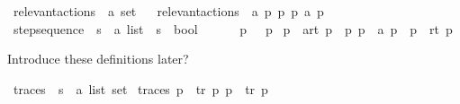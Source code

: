 \begin{isabellebody}
\isamarkupfalse%
\ relevant{\isacharunderscore}{\kern0pt}actions\ {\isacharcolon}{\kern0pt}{\isacharcolon}{\kern0pt}\ {\isacartoucheopen}{\isacharprime}{\kern0pt}a\ set{\isacartoucheclose}\isanewline
\ \ \isanewline
{\isacartoucheopen}relevant{\isacharunderscore}{\kern0pt}actions\ {\isasymequiv}\ {\isacharbraceleft}{\kern0pt}a{\isachardot}{\kern0pt}\ {\isasymexists}p\ p{\isacharprime}{\kern0pt}{\isachardot}{\kern0pt}\ p\ {\isasymmapsto}a\ p{\isacharprime}{\kern0pt}{\isacharbraceright}{\kern0pt}{\isacartoucheclose}\isanewline
\isanewline
{}\isamarkupfalse%
\ step{\isacharunderscore}{\kern0pt}sequence\ {\isacharcolon}{\kern0pt}{\isacharcolon}{\kern0pt}\ {\isacartoucheopen}{\isacharprime}{\kern0pt}s\ {\isasymRightarrow}\ {\isacharprime}{\kern0pt}a\ list\ {\isasymRightarrow}\ {\isacharprime}{\kern0pt}s\ {\isasymRightarrow}\ bool{\isacartoucheclose}\ {\isacharparenleft}{\kern0pt}{\isacartoucheopen}{\isacharunderscore}{\kern0pt}\ {\isasymmapsto}{\isachardollar}{\kern0pt}\ {\isacharunderscore}{\kern0pt}\ {\isacharunderscore}{\kern0pt}{\isacartoucheclose}{\isacharbrackleft}{\kern0pt}{}{}{\isacharcomma}{\kern0pt}{}{}{\isacharcomma}{\kern0pt}{}{}{\isacharbrackright}{\kern0pt}\ {}{}{\isacharparenright}{\kern0pt}\ \isanewline
{\isacartoucheopen}p\ {\isasymmapsto}{\isachardollar}{\kern0pt}\ {\isacharbrackleft}{\kern0pt}{\isacharbrackright}{\kern0pt}\ p{\isacartoucheclose}\ {\isacharbar}{\kern0pt}\isanewline
{\isacartoucheopen}p\ {\isasymmapsto}{\isachardollar}{\kern0pt}\ {\isacharparenleft}{\kern0pt}a{\isacharhash}{\kern0pt}rt{\isacharparenright}{\kern0pt}\ p{\isacharprime}{\kern0pt}{\isacharprime}{\kern0pt}{\isacartoucheclose}\ \ {\isacartoucheopen}{\isasymexists}p{\isacharprime}{\kern0pt}{\isachardot}{\kern0pt}\ p\ {\isasymmapsto}\ a\ p{\isacharprime}{\kern0pt}\ {\isasymand}\ p{\isacharprime}{\kern0pt}\ {\isasymmapsto}{\isachardollar}{\kern0pt}\ rt\ p{\isacharprime}{\kern0pt}{\isacharprime}{\kern0pt}{\isacartoucheclose}%
\begin{isamarkuptext}%
Introduce these definitions later?%
\end{isamarkuptext}\isamarkuptrue%
\isamarkupfalse%
\ traces\ {\isacharcolon}{\kern0pt}{\isacharcolon}{\kern0pt}\ {\isacartoucheopen}{\isacharprime}{\kern0pt}s\ {\isasymRightarrow}\ {\isacharprime}{\kern0pt}a\ list\ set{\isacartoucheclose}\ \isanewline
{\isacartoucheopen}traces\ p\ {\isasymequiv}\ {\isacharbraceleft}{\kern0pt}tr{\isachardot}{\kern0pt}\ {\isasymexists}p{\isacharprime}{\kern0pt}{\isachardot}{\kern0pt}\ p\ {\isasymmapsto}{\isachardollar}{\kern0pt}\ tr\ p{\isacharprime}{\kern0pt}{\isacharbraceright}{\kern0pt}{\isacartoucheclose}\isanewline

\end{isabellebody}
